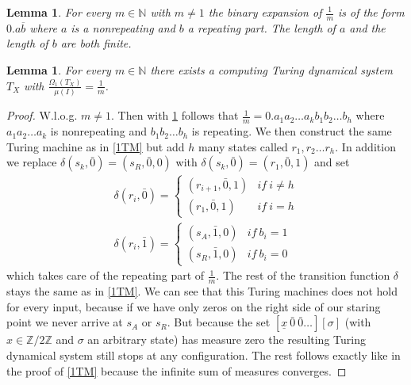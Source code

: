 \documentclass[12pt,a4paper]{scrartcl}
\theoremstyle{plain}
\newtheorem{Lemma}[Theorem]{Lemma}
\theoremstyle{definition}
\numberwithin{equation}{section}
\newcommand{\N}{\mathbb{N}} %
\newcommand{\2}{\mathbb{Z} / 2 \mathbb{Z}}
\newcommand{\1}{\bar{1}}
\newcommand{\0}{\bar{0}}
\begin{document}
\begin{Lemma} \label{frac}
	For every $m \in \N$ with $m \neq 1$ the binary expansion of $\frac{1}{m}$ is of the form $0. a \overline{b}$ where $a$ is a nonrepeating and $b$ a repeating part. The length of $a$ and the length of $b$ are both finite.
\end{Lemma}
\begin{Lemma} \label{2TM}
	For every $m \in \N$ there exists a computing Turing dynamical system $T_X$ with $\frac{\Omega_1(T_X)}{\mu(I)} = \frac{1}{m}$.
\end{Lemma}
\begin{proof}
	W.l.o.g. $m \neq 1$. Then with \ref{frac} follows that $\frac{1}{m} = 0.a_1a_2 \ldots a_k b_1 b_2 \ldots b_h$ where $a_1a_2 \ldots a_k$ is nonrepeating and $b_1 b_2 \ldots b_h$ is repeating. We then construct the same Turing machine as in \ref{1TM} but add $h$ many states called $r_1, r_2 \ldots r_h$. In addition we replace $\delta(s_k, \0) = (s_R, \0, 0)$ with $\delta(s_k, \0) = (r_1, \0, 1)$ and set
	\begin{align*}
		\delta(r_i, \0) = \begin{cases}
			(r_{i+1}, \0, 1) & if \ i \neq h \\
			(r_1, \0, 1) & if \ i = h
		\end{cases} \\
		\delta(r_i, \1) = \begin{cases}
			(s_A, \1, 0) & if \ b_i = 1 \\
			(s_R, \1, 0) & if \ b_i = 0
		\end{cases}
	\end{align*}
	which takes care of the repeating part of $\frac{1}{m}$. The rest of the transition function $\delta$ stays the same as in \ref{1TM}. We can see that this Turing machines does not hold for every input, because if we have only zeros on the right side of our staring point we never arrive at $s_A$ or $s_R$. But because the set $[\underline{x} \ \0 \ \0 \ldots][\sigma]$ (with $x \in \2$ and $\sigma$ an arbitrary state) has measure zero the resulting Turing dynamical system still stops at any configuration. The rest follows exactly like in the proof of \ref{1TM} because the infinite sum of measures converges.
\end{proof}
\end{document}
